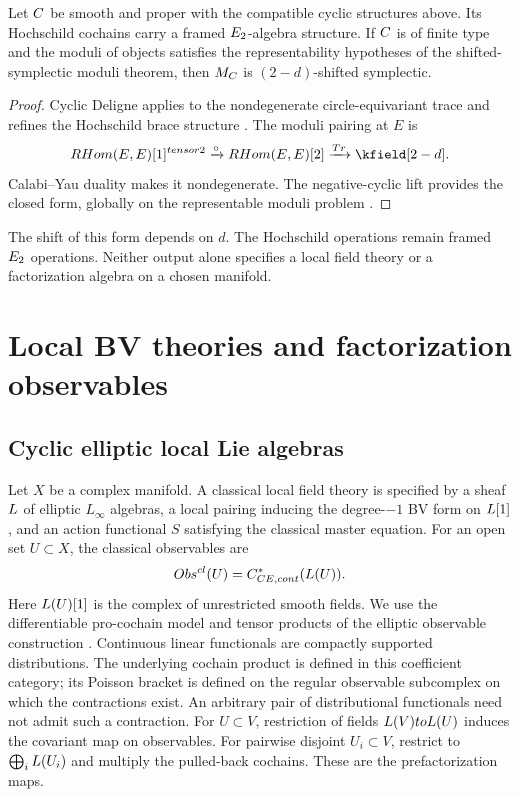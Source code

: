 \begin{theorem}
Let $C$ be smooth and proper with the compatible cyclic structures
above. Its Hochschild cochains carry a framed $E_2$-algebra structure.
If $C$ is of finite type and the moduli of objects satisfies the
representability hypotheses of the shifted-symplectic moduli theorem,
then $M_{C}$ is $(2-d)$-shifted symplectic.
\end{theorem}
\begin{proof}
Cyclic Deligne applies to the nondegenerate circle-equivariant trace
and refines the Hochschild brace structure \cite{BravRozenblyum}.
The moduli pairing at $E$ is
\[
 \RHom(E,E)[1]^{\tensor2}\xrightarrow{\circ}\RHom(E,E)[2]
       \xrightarrow{\Tr}\kfield[2-d].
\]
Calabi--Yau duality makes it nondegenerate. The negative-cyclic lift
provides the closed form, globally on the representable moduli problem
\cite{PTVV,BravDyckerhoff}.
\end{proof}

The shift of this form depends on $d$. The Hochschild operations remain
framed $E_2$ operations. Neither output alone specifies a local field
theory or a factorization algebra on a chosen manifold.

\section{Local BV theories and factorization observables}
\subsection{Cyclic elliptic local Lie algebras}
Let $X$ be a complex manifold. A classical local field theory is specified by a sheaf $L$ of elliptic $L_\infty$ algebras, a local pairing inducing the degree-$-1$ BV form on $L[1]$, and an action functional $S$ satisfying the classical master equation. For an open set $U\subset X$, the classical observables are
\[
 Obs^{cl}(U)=C^*_{CE,cont}(L(U)).
\]
Here $L(U)[1]$ is the complex of unrestricted smooth fields. We use the
differentiable pro-cochain model and tensor products of the elliptic
observable construction \cite{CG1,CG2}. Continuous linear functionals
are compactly supported distributions. The underlying cochain product
is defined in this coefficient category; its Poisson bracket is defined
on the regular observable subcomplex on which the contractions exist.
An arbitrary pair of distributional functionals need not admit such a
contraction.
For $U\subset V$, restriction of fields $L(V)toL(U)$
induces the covariant map on observables.
For pairwise disjoint $U_i\subset V$, restrict to
$\bigoplus_iL(U_i)$ and multiply the pulled-back cochains.
These are the prefactorization maps.

